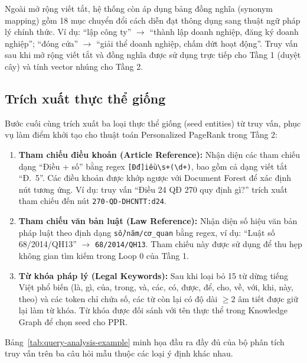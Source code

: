 Ngoài mở rộng viết tắt, hệ thống còn áp dụng bảng đồng nghĩa (synonym mapping) gồm
18 mục chuyển đổi cách diễn đạt thông dụng sang thuật ngữ pháp lý chính thức. Ví dụ:
``lập công ty'' $\to$ ``thành lập doanh nghiệp, đăng ký doanh nghiệp''; ``đóng cửa''
$\to$ ``giải thể doanh nghiệp, chấm dứt hoạt động''. Truy vấn sau khi mở rộng viết
tắt và đồng nghĩa được sử dụng trực tiếp cho Tầng 1 (duyệt cây) và tính vector nhúng
cho Tầng 2.

\subsection{Trích xuất thực thể giống}
\label{subsec:trich-xuat-thuc-the}

Bước cuối cùng trích xuất ba loại thực thể giống (seed entities) từ truy vấn, phục vụ
làm điểm khởi tạo cho thuật toán Personalized PageRank trong Tầng 2:

\begin{enumerate}
  \item \textbf{Tham chiếu điều khoản (Article Reference):} Nhận diện các tham chiếu
        dạng ``Điều + số'' bằng regex \texttt{[Đđ]iều\textbackslash s+(\textbackslash d+)},
        bao gồm cả dạng viết tắt ``Đ.~5''. Các điều khoản được khớp ngược với
        Document Forest để xác định nút tương ứng. Ví dụ: truy vấn ``Điều 24 QĐ 270
        quy định gì?'' trích xuất tham chiếu đến nút \texttt{270-QD-DHCNTT:d24}.

  \item \textbf{Tham chiếu văn bản luật (Law Reference):} Nhận diện số hiệu văn bản
        pháp luật theo định dạng \texttt{số/năm/cơ\_quan} bằng regex, ví dụ:
        ``Luật số 68/2014/QH13'' $\to$ \texttt{68/2014/QH13}. Tham chiếu này được
        sử dụng để thu hẹp không gian tìm kiếm trong Loop 0 của Tầng 1.

  \item \textbf{Từ khóa pháp lý (Legal Keywords):} Sau khi loại bỏ 15 từ dừng tiếng
        Việt phổ biến (là, gì, của, trong, và, các, có, được, để, cho, về, với, khi,
        này, theo) và các token chỉ chứa số, các từ còn lại có độ dài $\geq 2$ âm
        tiết được giữ lại làm từ khóa. Từ khóa được đối sánh với tên thực thể trong
        Knowledge Graph để chọn seed cho PPR.
\end{enumerate}

Bảng~\ref{tab:query-analysis-example} minh họa đầu ra đầy đủ của bộ phân tích truy
vấn trên ba câu hỏi mẫu thuộc các loại ý định khác nhau.

